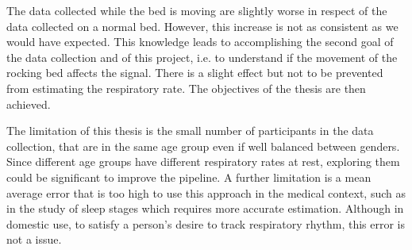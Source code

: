 The data collected while the bed is moving are slightly worse in respect of the data collected on a normal bed. However, this increase is not as consistent as we would have expected. This knowledge leads to accomplishing the second goal of the data collection and of this project, i.e. to understand if the movement of the rocking bed affects the signal. There is a slight effect but not to be prevented from estimating the respiratory rate.
The objectives of the thesis are then achieved.

The limitation of this thesis is the small number of participants in the data collection, that are in the same age group even if well balanced between genders. Since different age groups have different respiratory rates at rest, exploring them could be significant to improve the pipeline. A further limitation is a mean average error that is too high to use this approach in the medical context, such as in the study of sleep stages which requires more accurate estimation. Although in domestic use, to satisfy a person's desire to track respiratory rhythm, this error is not a issue.